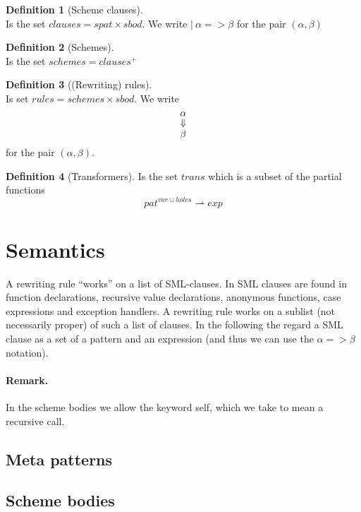 \documentclass[oneside]{memoir}
\theoremstyle{definition}
\newtheorem{definition}{Definition}
\begin{document}
\begin{definition}[Scheme clauses] \ \\
  Is the set $clauses = spat \times sbod$. We write $|\ \alpha => \beta$ for the pair
  $(\alpha, \beta)$
\end{definition}

\begin{definition}[Schemes] \ \\
  Is the set $schemes = clauses^{+}$
\end{definition}

\begin{definition}[(Rewriting) rules] \ \\
  Is set $rules = schemes \times sbod$. We write
  \[
  \shortstack[ccc]{$\alpha$ \\ $\Downarrow$ \\ $\beta$}
  \]
  for the pair $(\alpha, \beta)$.
\end{definition}

\begin{definition}[Transformers]
  Is the set $trans$ which is a subset of the partial functions
  \[
  pat^{var \cup holes} \rightharpoonup exp
  \]
\end{definition}

\section{Semantics}
A rewriting rule ``works'' on a list of SML-clauses. In SML clauses are found in
function declarations, recursive value declarations, anonymous functions, case
expressions and exception handlers. A rewriting rule works on a sublist (not
necessarily proper) of such a list of clauses. In the following the regard a SML
clause as a set of a pattern and an expression (and thus we can use the $\alpha
=> \beta$ notation).

\paragraph{Remark.} In the scheme bodies we allow the keyword \textsf{self},
which we take to mean a recursive call.

\subsection{Meta patterns}

\subsection{Scheme bodies}
\end{document}
